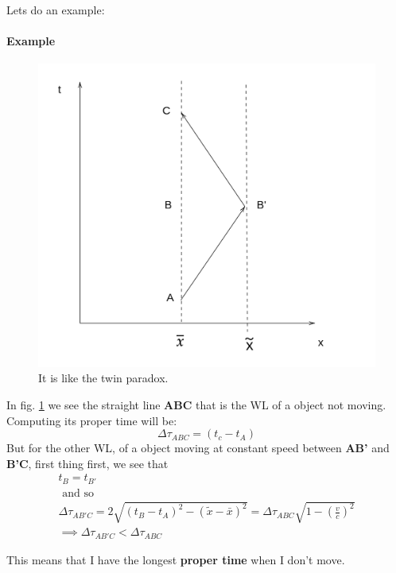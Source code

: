 \documentclass{report}
\begin{document}
Lets do an example:
\paragraph{Example}
\begin{figure}
\centering
\includegraphics[width=\linewidth]{imm/examplelec3.png}
\caption{It is like the twin paradox.}
\label{imm:examplelec3}
\end{figure}

In fig. \ref{imm:examplelec3} we see the straight line \textbf{ABC} that is the WL of a object not moving. 
Computing its proper time will be:
\begin{equation}
\Delta \tau_{ABC} = \left( t_{c}-t_{A} \right)
\end{equation}
But for the other WL, of a object moving at constant speed between \textbf{AB'} and \textbf{B'C}, first thing first, we see that
\begin{gather*}
t_{B} = t_{B'} \\
\text{ and so } \\
\Delta \tau_{AB'C} = 2 \sqrt{\left( t_{B} - t_{A} \right)^{2} - \left( \tilde{x} - \bar{x} \right)^{2}} = \Delta \tau_{ABC} \sqrt{1 - \left( \frac{v}{c}  \right)^{2}} \\
\implies \Delta \tau_{AB'C} < \Delta \tau_{ABC}
\end{gather*}

This means that I have the longest \textbf{proper time} when I don't move.
\end{document}

